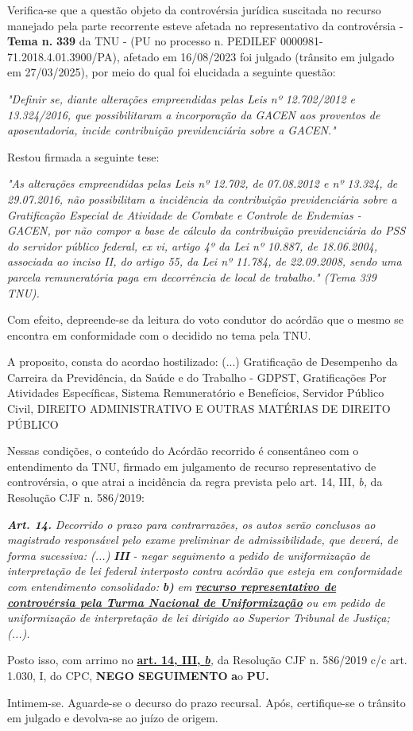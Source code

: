 \documentclass[12pt]{article}
\begin{document}
\justifying
\noindent Verifica-se que a questão objeto da controvérsia jurídica suscitada no recurso manejado pela parte recorrente esteve afetada no representativo da controvérsia - \textbf{Tema n. }\textbf{339} da TNU - (PU no processo n. PEDILEF 0000981-71.2018.4.01.3900/PA),  afetado em 16/08/2023 foi julgado (trânsito em julgado em 27/03/2025), por meio do qual foi elucidada a seguinte questão:

\noindent \textit{"Definir se, diante alterações empreendidas pelas Leis nº 12.702/2012 e 13.324/2016, que possibilitaram a incorporação da GACEN aos proventos de aposentadoria, incide contribuição previdenciária sobre a GACEN."}

\noindent Restou firmada a seguinte tese:

\noindent \textit{"As alterações empreendidas pelas Leis nº 12.702, de 07.08.2012 e nº 13.324, de 29.07.2016, não possibilitam a incidência da contribuição previdenciária sobre a Gratificação Especial de Atividade de Combate e Controle de Endemias - GACEN, por não compor a base de cálculo da contribuição previdenciária do PSS do servidor público federal, ex vi, artigo 4º da Lei nº 10.887, de 18.06.2004, associada ao inciso II, do artigo 55, da Lei nº 11.784, de 22.09.2008, sendo uma parcela remuneratória paga em decorrência de local de trabalho." (Tema 339 TNU).}

\noindent Com efeito, depreende-se da leitura do voto condutor do acórdão que o mesmo se encontra em conformidade com o decidido no  tema pela TNU.

\noindent A proposito, consta do acordao hostilizado: (...) Gratificação de Desempenho da Carreira da Previdência, da Saúde e do Trabalho - GDPST, Gratificações Por Atividades Específicas, Sistema Remuneratório e Benefícios, Servidor Público Civil, DIREITO ADMINISTRATIVO E OUTRAS MATÉRIAS DE DIREITO PÚBLICO

\noindent Nessas condições, o conteúdo do Acórdão recorrido é consentâneo com o entendimento da TNU, firmado em julgamento de recurso representativo de controvérsia, o que atrai a incidência da regra prevista pelo art. 14, III, \textit{b,} da Resolução CJF n. 586/2019:

\noindent \textit{\textbf{Art. 14.}}\textit{ Decorrido o prazo para contrarrazões, os autos serão conclusos ao magistrado responsável pelo exame preliminar de admissibilidade, que deverá, de forma sucessiva: (...) }\textit{\textbf{III }}\textit{- negar seguimento a pedido de uniformização de interpretação de lei federal interposto contra acórdão que esteja em conformidade com entendimento consolidado: }\textit{\textbf{b)}}\textit{ em }\uline{\textit{\textbf{recurso representativo de controvérsia pela Turma Nacional de Uniformização}}}\textit{ ou em pedido de uniformização de interpretação de lei dirigido ao Superior Tribunal de Justiça;(...).}

\noindent Posto isso, com arrimo no \uline{\textbf{art. 14, III, }}\uline{\textit{\textbf{b}}}\textit{,} da Resolução CJF n. 586/2019 c/c art. 1.030, I, do CPC, \textbf{NEGO SEGUIMENTO }\textbf{a}o\textbf{ PU}\textbf{.}

\noindent Intimem-se. Aguarde-se o decurso do prazo recursal. Após, certifique-se o trânsito em julgado e devolva-se ao juízo de origem.
\end{document}

